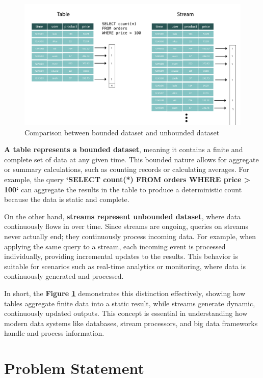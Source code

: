 \documentclass[12pt, a4paper]{article}
\begin{document}
\begin{figure}[H]
    \centering
    \includegraphics[width=\textwidth]{Images/unbounded-data.png}
    \vspace{1em}
    \caption{Comparison between bounded dataset and unbounded dataset}
    \label{fig:comparison}
\end{figure}

\textbf{A table represents a bounded dataset}, meaning it contains a finite and
complete set of data at any given time. This bounded nature allows for aggregate
or summary calculations, such as counting records or calculating averages. For
example, the query \textbf{`SELECT count(*) FROM orders WHERE price > 100`} can
aggregate the results in the table to produce a deterministic count because the
data is static and complete.

On the other hand, \textbf{streams represent unbounded dataset}, where data
continuously flows in over time. Since streams are ongoing, queries on streams
never actually end; they continuously process incoming data. For example, when
applying the same query to a stream, each incoming event is processed
individually, providing incremental updates to the results. This behavior is
suitable for scenarios such as real-time analytics or monitoring, where data is
continuously generated and processed.

In short, the \textbf{Figure \ref{fig:comparison}} demonstrates this distinction
effectively, showing how tables aggregate finite data into a static result,
while streams generate dynamic, continuously updated outputs. This concept is
essential in understanding how modern data systems like databases, stream
processors, and big data frameworks handle and process information.

\section{Problem Statement}
\end{document}
